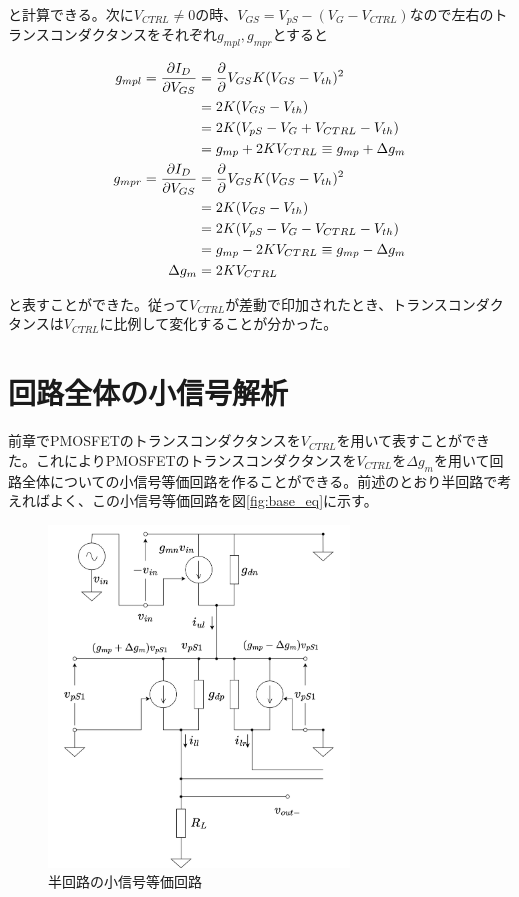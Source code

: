 \documentclass[twocolumn]{jsarticle}
\begin{document}
と計算できる。次に$V_{CTRL}\neq0$の時、$V_{GS}=V_{pS}- \left( V_{G}-V_{CTRL} \right)$なので左右のトランスコンダクタンスをそれぞれ$g_{mpl},g_{mpr}$とすると

\begin{align}
    g_{mpl} = \frac{\partial I_{D}}{\partial V_{GS}} &= \frac{\partial}{\partial }V_{GS} K(V_{GS}-V_{th})^{2} \notag\\
    &=2K(V_{GS}-V_{th})    \notag\\ 
    &=2K(V_{pS}-V_{G}+V_{CTRL}-V_{th})  \notag\\
    &=g_{mp}+2KV_{CTRL}\equiv g_{mp}+\Delta g_{m}   \label{eq:g_mpl}\\
    g_{mpr} = \frac{\partial I_{D}}{\partial V_{GS}} &= \frac{\partial}{\partial }V_{GS} K(V_{GS}-V_{th})^{2} \notag\\
    &=2K(V_{GS}-V_{th})    \notag\\ 
    &=2K(V_{pS}-V_{G}-V_{CTRL}-V_{th})  \notag\\
    &=g_{mp}-2KV_{CTRL}\equiv g_{mp}-\Delta g_{m}   \label{eq:g_mpr}\\
    \Delta g_{m}&=2KV_{CTRL}   \label{eq:delta_gm}
\end{align}

と表すことができた。従って$V_{CTRL}$が差動で印加されたとき、トランスコンダクタンスは$V_{CTRL}$に比例して変化することが分かった。

\section{回路全体の小信号解析}
前章でPMOSFETのトランスコンダクタンスを$V_{CTRL}$を用いて表すことができた。これによりPMOSFETのトランスコンダクタンスを$V_{CTRL}$を$\Delta g_{m}$を用いて回路全体についての小信号等価回路を作ることができる。前述のとおり半回路で考えればよく、この小信号等価回路を図\eqref{fig:base_eq}に示す。

\begin{figure}[h]
    \begin{center}
        \includegraphics*[width=80mm]{figures/FoldedGilbertHalfBaseEquivalentCircuit.png}
        \caption{半回路の小信号等価回路}
        \label{fig:base_eq}
    \end{center}
\end{figure}
\end{document}

